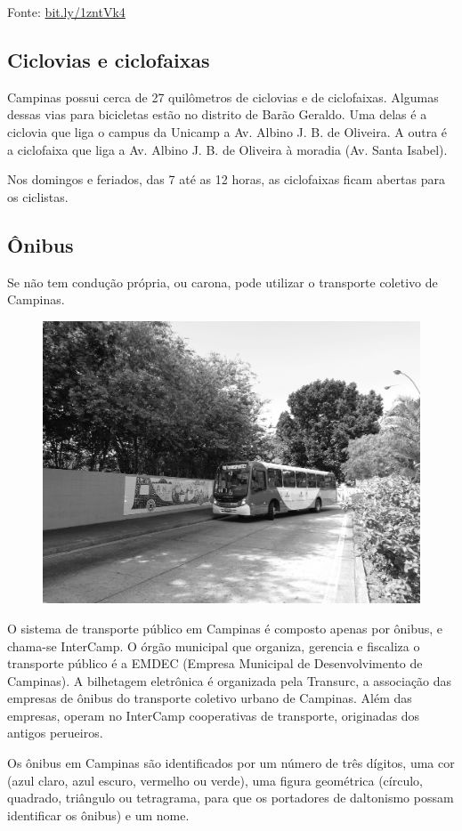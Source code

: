 Fonte:
\url{bit.ly/1zntVk4}

\subsection{Ciclovias e ciclofaixas}

Campinas possui cerca de 27 quilômetros de ciclovias e de ciclofaixas. Algumas
dessas vias para bicicletas estão no distrito de Barão Geraldo. Uma delas é a
ciclovia que liga o campus da Unicamp a Av. Albino J. B. de Oliveira. A outra é
a ciclofaixa que liga a Av. Albino J. B. de Oliveira à moradia (Av. Santa
Isabel).

Nos domingos e feriados, das 7 até as 12 horas, as ciclofaixas ficam abertas
para os ciclistas.

\subsection{Ônibus}

Se não tem condução própria, ou carona, pode utilizar o transporte coletivo de
Campinas.

\begin{figure}[h!]  \centering
    \includegraphics[width=.45\textwidth]{img/barao/onibus.jpg}
\end{figure}

O sistema de transporte público em Campinas é composto apenas por ônibus, e
chama-se InterCamp. O órgão municipal que organiza, gerencia e fiscaliza o
transporte público é a EMDEC (Empresa Municipal de Desenvolvimento de Campinas).
A bilhetagem eletrônica é organizada pela Transurc, a associação das empresas de
ônibus do transporte coletivo urbano de Campinas. Além das empresas, operam no
InterCamp cooperativas de transporte, originadas dos antigos perueiros.

Os ônibus em Campinas são identificados por um número de três dígitos, uma cor
(azul claro, azul escuro, vermelho ou verde), uma figura geométrica (círculo,
quadrado, triângulo ou tetragrama, para que os portadores de daltonismo possam
identificar os ônibus) e um nome.


